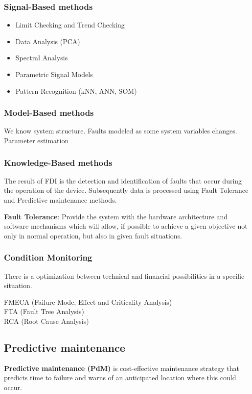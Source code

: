 \documentclass[class=article, crop=false]{standalone}
\begin{document}
\subsubsection{Signal-Based methods}
\begin{itemize}
    \item Limit Checking and Trend Checking
    \item Data Analysis (PCA)
    \item Spectral Analysis
    \item Parametric Signal Models
    \item Pattern Recognition (kNN, ANN, SOM)
\end{itemize}
\subsubsection{Model-Based methods}
We know system structure. Faults modeled as some system variables changes.
Parameter estimation


\subsubsection{Knowledge-Based methods}


The result of FDI is the detection and identification of faults that occur
during the operation of the device. Subsequently data is processed using
Fault Tolerance and Predictive maintenance methods.

\textbf{Fault Tolerance}: Provide the system with the hardware architecture and
  software mechanisms which will allow, if possible to achieve a given
  objective not only in normal operation, but also in given fault
  situations.


\subsubsection{Condition Monitoring}
There is a optimization between technical and financial possibilities in a
specific situation.

FMECA (Failure Mode, Effect and Criticality Analysis) \\
FTA (Fault Tree Analysis) \\
RCA (Root Cause Analysis) \\


% 


\subsection{Predictive maintenance}
\textbf{Predictive maintenance (PdM)} is cost-effective maintenance strategy that
predicts time to failure and warns of an anticipated location where this
could occur.
\end{document}
